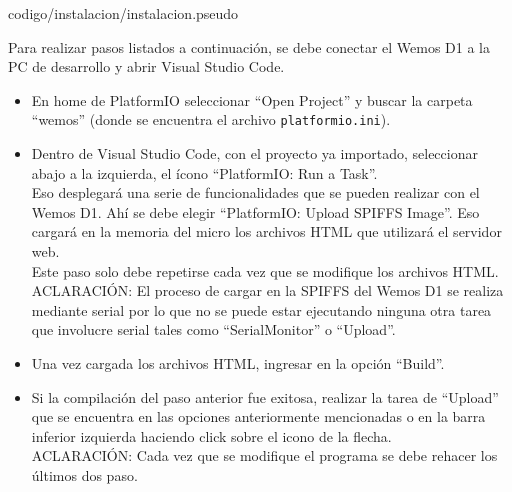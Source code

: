     
                     {codigo/instalacion/instalacion.pseudo}
    
    Para realizar pasos listados a continuación, se debe conectar el Wemos D1 a la PC de desarrollo y abrir Visual Studio Code.
    \begin{itemize}
        \item En home de PlatformIO seleccionar \enquote{Open Project} y buscar la carpeta \enquote{wemos} (donde se encuentra el archivo \texttt{platformio.ini}).
        \item Dentro de Visual Studio Code, con el proyecto ya importado, seleccionar abajo a la izquierda, el ícono \enquote{PlatformIO: Run a Task}.\\
        Eso desplegará una serie de funcionalidades que se pueden realizar con el Wemos D1. Ahí se debe elegir \enquote{PlatformIO: Upload SPIFFS Image}. Eso cargará en la memoria del micro los archivos HTML que utilizará el servidor web.\\
        Este paso solo debe repetirse cada vez que se modifique los archivos HTML.\\
        ACLARACIÓN: El proceso de cargar en la SPIFFS del Wemos D1 se realiza mediante serial por lo que no se puede estar ejecutando ninguna otra tarea que involucre serial tales como \enquote{SerialMonitor} o \enquote{Upload}.
        \item Una vez cargada los archivos HTML, ingresar en la opción \enquote{Build}.
        \item Si la compilación del paso anterior fue exitosa, realizar la tarea de \enquote{Upload} que se encuentra en las opciones anteriormente mencionadas o en la barra inferior izquierda haciendo click sobre el icono de la flecha.\\
        ACLARACIÓN: Cada vez que se modifique el programa se debe rehacer los últimos dos paso.
    \end{itemize}